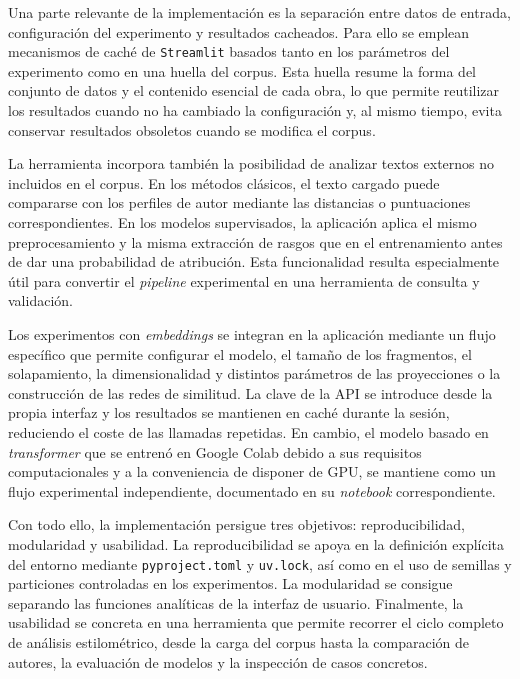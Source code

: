 \documentclass[IB]{TFUOC}%
\begin{document}
Una parte relevante de la implementación es la separación entre datos de entrada, configuración del experimento y resultados cacheados. Para ello se emplean mecanismos de caché de \texttt{Streamlit} basados tanto en los parámetros del experimento como en una huella del corpus. Esta huella resume la forma del conjunto de datos y el contenido esencial de cada obra, lo que permite reutilizar los resultados cuando no ha cambiado la configuración y, al mismo tiempo, evita conservar resultados obsoletos cuando se modifica el corpus.

La herramienta incorpora también la posibilidad de analizar textos externos no incluidos en el corpus. En los métodos clásicos, el texto cargado puede compararse con los perfiles de autor mediante las distancias o puntuaciones correspondientes. En los modelos supervisados, la aplicación aplica el mismo preprocesamiento y la misma extracción de rasgos que en el entrenamiento antes de dar una probabilidad de atribución. Esta funcionalidad resulta especialmente útil para convertir el \textit{pipeline} experimental en una herramienta de consulta y validación.

Los experimentos con \textit{embeddings} se integran en la aplicación mediante un flujo específico que permite configurar el modelo, el tamaño de los fragmentos, el solapamiento, la dimensionalidad y distintos parámetros de las proyecciones o la construcción de las redes de similitud. La clave de la API se introduce desde la propia interfaz y los resultados se mantienen en caché durante la sesión, reduciendo el coste de las llamadas repetidas. En cambio, el modelo basado en \textit{transformer} que se entrenó en Google Colab debido a sus requisitos computacionales y a la conveniencia de disponer de GPU, se mantiene como un flujo experimental independiente, documentado en su \textit{notebook} correspondiente.

Con todo ello, la implementación persigue tres objetivos: reproducibilidad, modularidad y usabilidad. La reproducibilidad se apoya en la definición explícita del entorno mediante \texttt{pyproject.toml} y \texttt{uv.lock}, así como en el uso de semillas y particiones controladas en los experimentos. La modularidad se consigue separando las funciones analíticas de la interfaz de usuario. Finalmente, la usabilidad se concreta en una herramienta que permite recorrer el ciclo completo de análisis estilométrico, desde la carga del corpus hasta la comparación de autores, la evaluación de modelos y la inspección de casos concretos.
\end{document}
